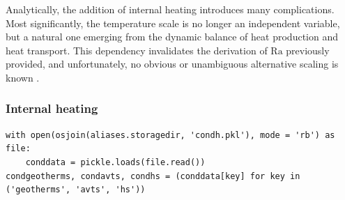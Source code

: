 Analytically, the addition of internal heating introduces many complications. Most significantly, the temperature scale is no longer an independent variable, but a natural one emerging from the dynamic balance of heat production and heat transport. This dependency invalidates the derivation of $\mathrm{Ra}$ previously provided, and unfortunately, no obvious or unambiguous alternative scaling is known \citet{Schubert2001-ea, Moore2008-je, Korenaga2017-an}.

\subsubsection{Internal heating}

\begin{verbatim}
with open(osjoin(aliases.storagedir, 'condh.pkl'), mode = 'rb') as file:
    conddata = pickle.loads(file.read())
condgeotherms, condavts, condhs = (conddata[key] for key in ('geotherms', 'avts', 'hs'))
\end{verbatim}

